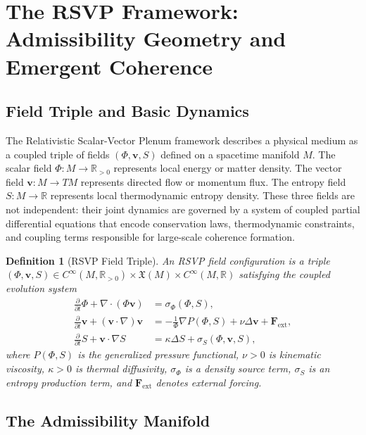 \documentclass[11pt, oneside]{article}
\numberwithin{equation}{section}
\theoremstyle{rsvpstyle}
\newtheorem{definition}[theorem]{Definition}
\theoremstyle{remark}
\newcommand{\vfield}{\mathbf{v}}
\newcommand{\Rspace}{\mathbb{R}}
\newcommand{\ppt}{\frac{\partial}{\partial t}}
\newcommand{\grad}{\nabla}
\begin{document}
\section{The RSVP Framework: Admissibility Geometry and Emergent Coherence}

\subsection{Field Triple and Basic Dynamics}

The Relativistic Scalar-Vector Plenum framework describes a physical medium as a coupled
triple of fields $(\Phi, \vfield, S)$ defined on a spacetime manifold $M$. The scalar
field $\Phi : M \to \Rspace_{>0}$ represents local energy or matter density. The vector
field $\vfield : M \to TM$ represents directed flow or momentum flux. The entropy field
$S : M \to \Rspace$ represents local thermodynamic entropy density. These three fields
are not independent: their joint dynamics are governed by a system of coupled partial
differential equations that encode conservation laws, thermodynamic constraints, and
coupling terms responsible for large-scale coherence formation.

\begin{definition}[RSVP Field Triple]
An RSVP field configuration is a triple $(\Phi, \vfield, S) \in C^\infty(M, \Rspace_{>0})
\times \mathfrak{X}(M) \times C^\infty(M, \Rspace)$ satisfying the coupled evolution
system
\begin{align}
  \ppt \Phi + \grad \cdot (\Phi \vfield) &= \sigma_\Phi(\Phi, S), \label{eq:rsvp1}\\
  \ppt \vfield + (\vfield \cdot \grad)\vfield &= -\frac{1}{\Phi}\grad P(\Phi, S)
    + \nu \Delta \vfield + \mathbf{F}_\text{ext}, \label{eq:rsvp2}\\
  \ppt S + \vfield \cdot \grad S &= \kappa \Delta S + \sigma_S(\Phi, \vfield, S),
  \label{eq:rsvp3}
\end{align}
where $P(\Phi, S)$ is the generalized pressure functional, $\nu > 0$ is kinematic
viscosity, $\kappa > 0$ is thermal diffusivity, $\sigma_\Phi$ is a density source term,
$\sigma_S$ is an entropy production term, and $\mathbf{F}_\text{ext}$ denotes external
forcing.
\end{definition}

\subsection{The Admissibility Manifold}
\end{document}
